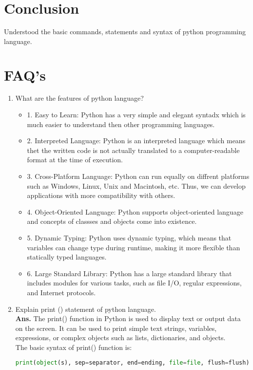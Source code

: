\documentclass{article}
\begin{document}
\section{\textbf{Conclusion}}
Understood the basic commands, statements and syntax of python programming language.
\section{\textbf{FAQ's}}
\begin{enumerate}
	\item What are the features of python language?\\
	\begin{itemize}
		\item 1. Easy to Learn: Python has a very simple  and elegant syntadx which is much easier to understand then other programming languages.
		\item 2. Interpreted  Language:  Python is an interpreted language which means thet the written code is not actually translated to a computer-readable format at the time of execution.
		\item 3. Cross-Platform Language: Python can run equally on diffrent platforms such as Windows, Linux, Unix and Macintosh, etc. Thus, we can develop applications with more compatibility with others.
		\item 4. Object-Oriented Language: Python supports object-oriented language and concepts of classses and objects come into existence.
		\item 5. Dynamic Typing: Python uses dynamic typing, which means that variables can change type during runtime, making it more flexible than statically typed languages.
		\item 6. Large Standard Library: Python has a large standard library that includes modules for various tasks, such as file I/O, regular expressions, and Internet protocols.
	\end{itemize}
	\item Explain print () statement of python language.\\
	\textbf{Ans.} The print() function in Python is used to display text or output data on the screen. It can be used to print simple text strings, variables, expressions, or complex objects such as lists, dictionaries, and objects.\\
	The basic syntax of print() function is: 
	\begin{lstlisting}[language=python, caption=Basic Syntax of Print function]
		print(object(s), sep=separator, end=ending, file=file, flush=flush)

\end{lstlisting}
\end{enumerate}
\end{document}
